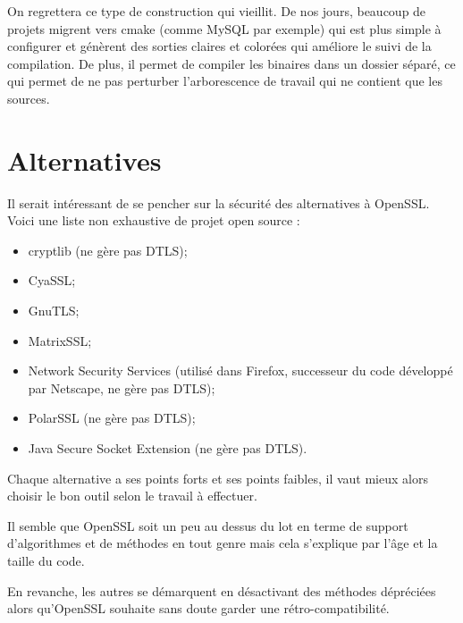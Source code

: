 On regrettera ce type de construction qui vieillit. De nos jours, beaucoup de projets migrent vers cmake (comme MySQL par exemple) qui est plus simple à configurer et génèrent des sorties claires et colorées qui améliore le suivi de la compilation. De plus, il permet de compiler les binaires dans un dossier séparé, ce qui permet de ne pas perturber l'arborescence de travail qui ne contient que les sources.


\section{Alternatives}
Il serait intéressant de se pencher sur la sécurité des alternatives à OpenSSL. Voici une liste non exhaustive de projet open source :
\begin{itemize}
\item cryptlib (ne gère pas DTLS);
\item CyaSSL;
\item GnuTLS;
\item MatrixSSL;
\item Network Security Services	(utilisé dans Firefox, successeur du code développé par Netscape, ne gère pas DTLS);
\item PolarSSL (ne gère pas DTLS);
\item Java Secure Socket Extension (ne gère pas DTLS).\\
\end{itemize}

Chaque alternative a ses points forts et ses points faibles, il vaut mieux alors choisir le bon outil selon le travail à effectuer.

Il semble que OpenSSL soit un peu au dessus du lot en terme de support d'algorithmes et de méthodes en tout genre mais cela s'explique par l'âge et la taille du code. 

En revanche, les autres se démarquent en désactivant des méthodes dépréciées alors qu'OpenSSL souhaite sans doute garder une rétro-compatibilité.
